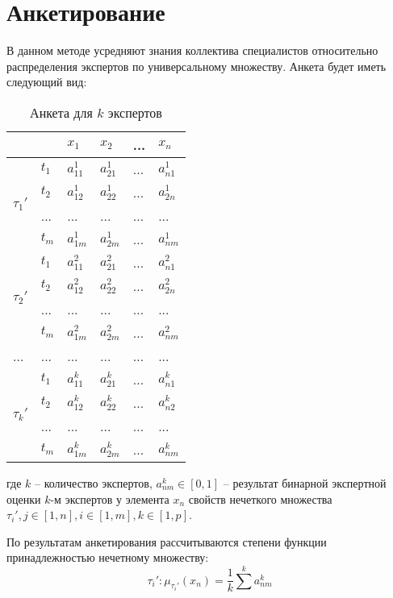 	\section{Анкетирование}

	\par В данном методе усредняют знания коллектива специалистов относительно распределения экспертов по универсальному множеству. Анкета будет иметь следующий вид:

	\begin{table}[!h]
	\centering
    \caption{Анкета для $k$ экспертов}
\begin{tabular}{|l|l|l|l|l|l|}
\hline
                   &     & $x_1$   & $x_2$   & ... & $x_n$   \\ \hline
\multirow{4}{*}{$\tau_1'$} & $t_1$  & $a_{11}^1$ & $a_{21}^1$ & ... & $a_{n1}^1$ \\ \cline{2-6} 
                   & $t_2$  & $a_{12}^1$ & $a_{22}^1$ & ... & $a_{2n}^1$ \\ \cline{2-6} 
                   & ... & ...  & ...  & ... & ...  \\ \cline{2-6} 
                   & $t_m$  & $a_{1m}^1$ & $a_{2m}^1$ & ... & $a_{nm}^1$ \\ \hline
\multirow{4}{*}{$\tau_2'$} & $t_1$  & $a_{11}^2$ & $a_{21}^2$ & ... & $a_{n1}^2$ \\ \cline{2-6} 
                   & $t_2$  & $a_{12}^2$ & $a_{22}^2$ & ... & $a_{2n}^2$ \\ \cline{2-6} 
                   & ... & ...  & ...  & ... & ...  \\ \cline{2-6} 
                   & $t_m$  & $a_{1m}^2$ & $a_{2m}^2$ & ... & $a_{nm}^2$ \\ \hline
...                & ... & ...  & ...  & ... & ...  \\ \hline
\multirow{4}{*}{$\tau_k'$} & $t_1$  & $a_{11}^k$ & $a_{21}^k$ & ... & $a_{n1}^k$ \\ \cline{2-6} 
                   & $t_2$  & $a_{12}^k$ & $a_{22}^k$ & ... & $a_{n2}^k$ \\ \cline{2-6} 
                   & ... & ...  & ...  & ... & ...  \\ \cline{2-6} 
                   & $t_m$  & $a_{1m}^k$ & $a_{2m}^k$ & ... & $a_{nm}^k$ \\ \hline
\end{tabular}
\label{tab:anket}
\end{table}
	где $k$ -- количество экспертов, $a_{nm}^k \in [0,1]$ -- результат бинарной экспертной оценки $k$-м экспертов у элемента $x_n$ свойств нечеткого множества $\tau_i', j \in [1,n], i \in [1,m],k \in [1,p]$.
	\par По результатам анкетирования рассчитываются степени функции принадлежностью нечетному множеству:
	\begin{equation}
	\tau_i': \mu_{\tau_i'}(x_n) = \frac{1}{k} \sum^{k}{a_{nm}^k}
	\end{equation}\label{formula:mu}

